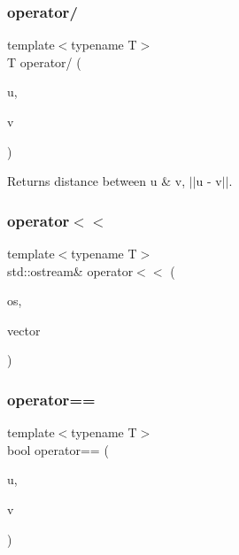 \subsubsection{\texorpdfstring{operator/}{operator/}\hspace{0.1cm}{\footnotesize\ttfamily [2/2]}}
{\footnotesize\ttfamily template$<$typename T$>$ \\
T operator/ (\begin{DoxyParamCaption}\item[{const \mbox{\hyperlink{class_n_vector}{N\+Vector}}$<$ T $>$ \&}]{u,  }\item[{const \mbox{\hyperlink{class_n_vector}{N\+Vector}}$<$ T $>$ \&}]{v }\end{DoxyParamCaption})\hspace{0.3cm}{\ttfamily [friend]}}

\begin{DoxyReturn}{Returns}
distance between u \& v, $\vert$$\vert$u -\/ v$\vert$$\vert$. 
\end{DoxyReturn}
\mbox{\label{class_n_vector_a050d56598b76afac2f22094360f46238}} 
\subsubsection{\texorpdfstring{operator$<$$<$}{operator<<}}
{\footnotesize\ttfamily template$<$typename T$>$ \\
std\+::ostream\& operator$<$$<$ (\begin{DoxyParamCaption}\item[{std\+::ostream \&}]{os,  }\item[{const \mbox{\hyperlink{class_n_vector}{N\+Vector}}$<$ T $>$ \&}]{vector }\end{DoxyParamCaption})\hspace{0.3cm}{\ttfamily [friend]}}

\mbox{\label{class_n_vector_aa1c22d1bc3a021b406c61d09f95d5e26}} 
\subsubsection{\texorpdfstring{operator==}{operator==}\hspace{0.1cm}{\footnotesize\ttfamily [1/3]}}
{\footnotesize\ttfamily template$<$typename T$>$ \\
bool operator== (\begin{DoxyParamCaption}\item[{const \mbox{\hyperlink{class_n_vector}{N\+Vector}}$<$ T $>$ \&}]{u,  }\item[{const \mbox{\hyperlink{class_n_vector}{N\+Vector}}$<$ T $>$ \&}]{v }\end{DoxyParamCaption})\hspace{0.3cm}{\ttfamily [friend]}}

